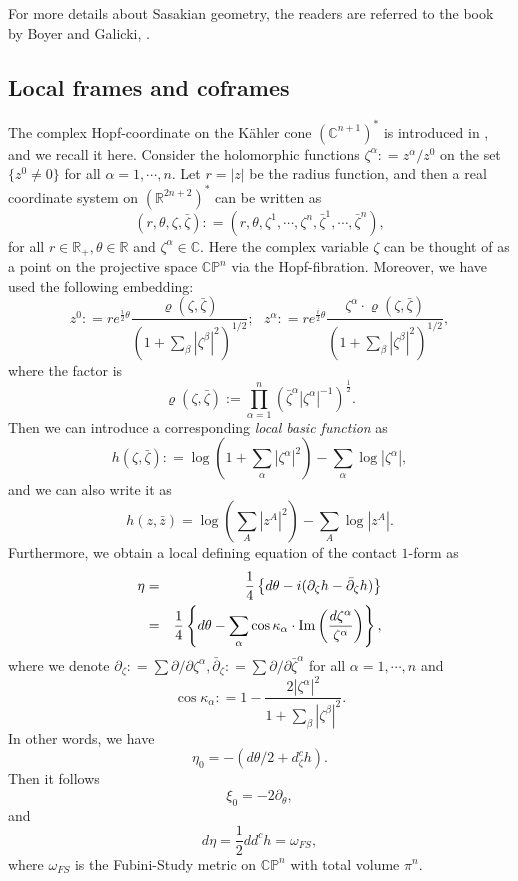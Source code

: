 \documentclass[a4paper,11pt]{amsart}
\numberwithin{equation}{section}
\def\Im{\mathop{\rm Im}\nolimits}
\def\dbar{\bar\partial}
\def\d{\partial}
\def\bC{{\mathbb C}}
\def\bR{{\mathbb R}}
\def\bP{{\mathbb P}}
\def\a{{\alpha}}
\def\z{{\zeta}}
\def\b{\beta}
\def\k{{\kappa}}
\begin{document}
For more details about Sasakian geometry, 
the readers are referred to the book by Boyer and Galicki, \cite{BG08}.



\subsection{Local frames and coframes}
The complex Hopf-coordinate on the K\"ahler cone $(\bC^{n+1})^*$ is introduced in \cite{HLX}, 
and we recall it here. 
Consider the holomorphic functions $\z^{\a}: = z^{\a}/ z^0$ on the set $\{ z^0 \neq 0 \}$ for all 
$\a = 1, \cdots, n$. 
Let $r = |z|$ be the radius function, and then a real coordinate system on $(\bR^{2n+2})^*$
can be written as 
$$ (r, \theta, \z, \bar\z): = (r, \theta, \z^1, \cdots, \z^n, \bar\z^1, \cdots, \bar\z^n),  $$
for all $r\in \bR_+, \theta\in \bR$ and $\z^{\a}\in \bC$. 
Here the complex variable $\z$ can be thought of as a point on the projective space $\bC\bP^n$
via the Hopf-fibration. 
Moreover, we have used the following embedding: 
\begin{equation}
\label{bf-001}
z^0: = r e^{\frac{i}{2}\theta} \frac{\varrho(\z ,\bar\z)}{ \left( 1+ \sum_{\b} |\z^{\b}|^2 \right)^{1/2}}; \ \ \ 
z^{\a}: = r e^{\frac{i}{2}\theta} \frac{\z^{\a} \cdot \varrho(\z ,\bar\z)}{ \left( 1+ \sum_{\b} |\z^{\b}|^2 \right)^{1/2}}, 
\end{equation}
where the factor is 
$$ \varrho(\z, \bar\z):= \prod_{\a=1}^n \left( \bar\z^{\a} |\z^{\a}|^{-1}\right)^{\frac{1}{2}}. $$
Then we can introduce a corresponding \emph{local basic function} as 
\begin{equation}
\label{bf-002}
h(\z, \bar\z): = \log\left( 1 + \sum_{\a} |\z^{\a}|^2 \right) - \sum_{\a} \log |\z^{\a}|, 
\end{equation}
and we can also write it as 
\begin{equation}
\label{bf-003}
h(z,\bar z) = \log\left(  \sum_{A} |z^{A}|^2 \right) -\sum_{A} \log |z^{A}|. 
\end{equation}
Furthermore, we obtain a local defining equation of the contact $1$-form as 
\begin{eqnarray}
\label{bf-004}
\eta &=& \frac{1}{4} \left\{ d\theta - i (\d_{\z} h - \dbar_{\z} h )    \right\}
\nonumber\\
&=&   \frac{1}{4} \left\{ d\theta -  \sum_{\a} \cos \k_{\a} \cdot \Im \left( \frac{d\z^{\a}}{\z^{\a}} \right) \right\},
\end{eqnarray}
where we denote $\d_{\z}: = \sum \d / \d \z^{\a}, \dbar_{\z}: = \sum \d/ \d \bar\z^{\a}$ 
for all $\a =1,\cdots, n$ and 
$$ \cos\k_{\a}: = 1- \frac{2|\z^\a|^2}{1+ \sum_{\b} |\z^\b|^2}. $$
In other words, we have 
\begin{equation}
\label{bf-005}
\eta_0 = - \left( d\theta/2 + d^c_{\z}h \right).
\end{equation}
Then it follows 
\begin{equation}
\label{bf-006}
\xi_0 = -2 \d_{\theta},
\end{equation}
and 
\begin{equation}
\label{bf-007}
d\eta = \frac{1}{2} dd^c h = \omega_{FS},
\end{equation}
where $\omega_{FS}$ is the Fubini-Study metric on $\bC\bP^n$ with total volume $\pi^n$. 
\end{document}
